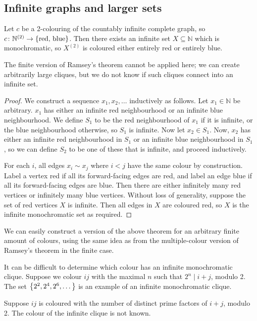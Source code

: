 \subsection{Infinite graphs and larger sets}
\begin{theorem}
	Let \( c \) be a 2-colouring of the countably infinite complete graph, so \( c \colon \mathbb N^{(2)} \to \qty{\text{red, blue}} \).
	Then there exists an infinite set \( X \subseteq \mathbb N \) which is monochromatic, so \( X^{(2)} \) is coloured either entirely red or entirely blue.
\end{theorem}
\begin{remark}
	The finite version of Ramsey's theorem cannot be applied here; we can create arbitrarily large cliques, but we do not know if such cliques connect into an infinite set.
\end{remark}
\begin{proof}
	We construct a sequence \( x_1, x_2, \dots \) inductively as follows.
	Let \( x_1 \in \mathbb N \) be arbitrary.
	\( x_1 \) has either an infinite red neighbourhood or an infinite blue neighbourhood.
	We define \( S_1 \) to be the red neighbourhood of \( x_1 \) if it is infinite, or the blue neighbourhood otherwise, so \( S_1 \) is infinite.
	Now let \( x_2 \in S_1 \).
	Now, \( x_2 \) has either an infinite red neighbourhood in \( S_1 \) or an infinite blue neighbourhood in \( S_1 \), so we can define \( S_2 \) to be one of these that is infinite, and proceed inductively.

	For each \( i \), all edges \( x_i \sim x_j \) where \( i < j \) have the same colour by construction.
	Label a vertex red if all its forward-facing edges are red, and label an edge blue if all its forward-facing edges are blue.
	Then there are either infinitely many red vertices or infinitely many blue vertices.
	Without loss of generality, suppose the set of red vertices \( X \) is infinite.
	Then all edges in \( X \) are coloured red, so \( X \) is the infinite monochromatic set as required.
\end{proof}
\begin{remark}
	We can easily construct a version of the above theorem for an arbitrary finite amount of colours, using the same idea as from the multiple-colour version of Ramsey's theorem in the finite case.
\end{remark}
\begin{example}
	It can be difficult to determine which colour has an infinite monochromatic clique.
	Suppose we colour \( ij \) with the maximal \( n \) such that \( 2^n \mid i + j \), modulo 2.
	The set \( \qty{2^2, 2^4, 2^6, \dots} \) is an example of an infinite monochromatic clique.

	Suppose \( ij \) is coloured with the number of distinct prime factors of \( i + j \), modulo 2.
	The colour of the infinite clique is not known.
\end{example}
